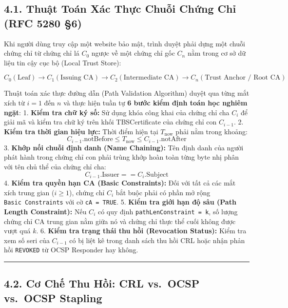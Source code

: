\documentclass[
]{article}
\begin{document}
\subsection{4.1. Thuật Toán Xác Thực Chuỗi Chứng Chỉ (RFC 5280
§6)}\label{thuux1eadt-touxe1n-xuxe1c-thux1ef1c-chuux1ed7i-chux1ee9ng-chux1ec9-rfc-5280-6}

Khi người dùng truy cập một website bảo mật, trình duyệt phải dựng một
chuỗi chứng chỉ từ chứng chỉ lá \(C_0\) ngược về một chứng chỉ gốc
\(C_n\) nằm trong cơ sở dữ liệu tin cậy cục bộ (Local Trust Store):

\[C_0 (\text{Leaf}) \to C_1 (\text{Issuing CA}) \to C_2 (\text{Intermediate CA}) \to C_n (\text{Trust Anchor / Root CA})\]

Thuật toán xác thực đường dẫn (Path Validation Algorithm) duyệt qua từng
mắt xích từ \(i = 1\) đến \(n\) và thực hiện tuần tự \textbf{6 bước kiểm
định toán học nghiêm ngặt}: 1. \textbf{Kiểm tra chữ ký số:} Sử dụng khóa
công khai của chứng chỉ cha \(C_i\) để giải mã và kiểm tra chữ ký trên
khối TBSCertificate của chứng chỉ con \(C_{i-1}\). 2. \textbf{Kiểm tra
thời gian hiệu lực:} Thời điểm hiện tại \(T_{\text{now}}\) phải nằm
trong khoảng:
\[C_{i-1}.\text{notBefore} \le T_{\text{now}} \le C_{i-1}.\text{notAfter}\]
3. \textbf{Khớp nối chuỗi định danh (Name Chaining):} Tên định danh của
người phát hành trong chứng chỉ con phải trùng khớp hoàn toàn từng byte
nhị phân với tên chủ thể của chứng chỉ cha:
\[C_{i-1}.\text{Issuer} == C_i.\text{Subject}\] 4. \textbf{Kiểm tra
quyền hạn CA (Basic Constraints):} Đối với tất cả các mắt xích trung
gian (\(i \ge 1\)), chứng chỉ \(C_i\) bắt buộc phải có phần mở rộng
\texttt{Basic\ Constraints} với cờ \texttt{cA\ =\ TRUE}. 5. \textbf{Kiểm
tra giới hạn độ sâu (Path Length Constraint):} Nếu \(C_i\) có quy định
\texttt{pathLenConstraint\ =\ k}, số lượng chứng chỉ CA trung gian nằm
giữa nó và chứng chỉ thực thể cuối không được vượt quá \(k\). 6.
\textbf{Kiểm tra trạng thái thu hồi (Revocation Status):} Kiểm tra xem
số seri của \(C_{i-1}\) có bị liệt kê trong danh sách thu hồi CRL hoặc
nhận phản hồi \texttt{REVOKED} từ OCSP Responder hay không.

\begin{center}\rule{0.5\linewidth}{0.5pt}\end{center}

\subsection{4.2. Cơ Chế Thu Hồi: CRL vs.~OCSP vs.~OCSP
Stapling}\label{cux1a1-chux1ebf-thu-hux1ed3i-crl-vs.-ocsp-vs.-ocsp-stapling}
\end{document}
